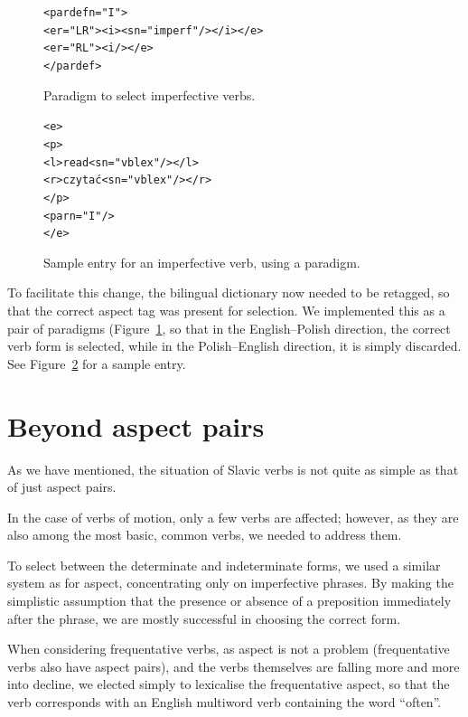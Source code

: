 \documentclass[11pt]{article}
\begin{document}
\begin{figure}[htbp]
\label{figure:pardef}
\begin{small}
\begin{alltt}
<pardef n="I">
  <e r="LR"><i><s n="imperf"/></i></e>
  <e r="RL"><i/></e>
</pardef>
\end{alltt}
\end{small}
\caption{Paradigm to select imperfective verbs.}
\end{figure}

\begin{figure}[htbp]
\label{figure:entry}
\begin{small}
\begin{alltt}
<e>
  <p>
    <l>read<s n="vblex"/></l>
    <r>czyta{\'{c}}<s n="vblex"/></r>
  </p>
  <par n="I"/>
</e>
\end{alltt}
\end{small}
\caption{Sample entry for an imperfective verb, using a paradigm.}
\end{figure}

To facilitate this change, the bilingual dictionary now needed to be
retagged, so that the correct aspect tag was present for selection. We
implemented this as a pair of paradigms (Figure~\ref{figure:pardef}, so that in the English--Polish
direction, the correct verb form is selected, while in the 
Polish--English direction, it is simply discarded. See Figure~\ref{figure:entry}
for a sample entry.

\section{Beyond aspect pairs}

As we have mentioned, the situation of Slavic verbs is not quite as
simple as that of just aspect pairs.

In the case of verbs of motion, only a few verbs are affected; however,
as they are also among the most basic, common verbs, we needed to 
address them. 

To select between the determinate and indeterminate forms, we used a
similar system as for aspect, concentrating only on imperfective
phrases. By making the simplistic assumption that the presence or
absence of a preposition immediately after the phrase, we are mostly
successful in choosing the correct form.

When considering frequentative verbs, as aspect is not a problem
(frequentative verbs also have aspect pairs), and the verbs themselves
are falling more and more into decline, we elected simply to lexicalise
the frequentative aspect, so that the verb corresponds with an English
multiword verb containing the word ``often''.\\ 
\end{document}
